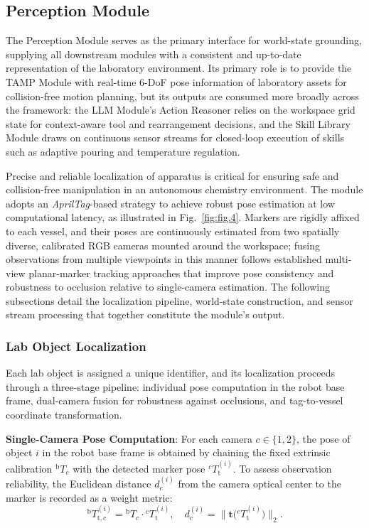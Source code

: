 \documentclass{ieeeaccess}
\begin{document}
\subsection{Perception Module}\label{sec:3.3}

The Perception Module serves as the primary interface for world-state grounding, supplying all downstream modules with a consistent and up-to-date representation of the laboratory environment. Its primary role is to provide the TAMP Module with real-time 6-DoF pose information of laboratory assets for collision-free motion planning, but its outputs are consumed more broadly across the framework: the LLM Module's Action Reasoner relies on the workspace grid state for context-aware tool and rearrangement decisions, and the Skill Library Module draws on continuous sensor streams for closed-loop execution of skills such as adaptive pouring and temperature regulation.

Precise and reliable localization of apparatus is critical for ensuring safe and collision-free manipulation in an autonomous chemistry environment. The module adopts an \textit{AprilTag}-based strategy \cite{wang2016apriltag} to achieve robust pose estimation at low computational latency, as illustrated in Fig.~\ref{fig:fig.4}. Markers are rigidly affixed to each vessel, and their poses are continuously estimated from two spatially diverse, calibrated RGB cameras mounted around the workspace; fusing observations from multiple viewpoints in this manner follows established multi-view planar-marker tracking approaches \cite{sarmadi2019simultaneous} that improve pose consistency and robustness to occlusion relative to single-camera estimation. The following subsections detail the localization pipeline, world-state construction, and sensor stream processing that together constitute the module's output.


\subsubsection{Lab Object Localization}\label{sec:3.3.1}
Each lab object is assigned a unique identifier, and its localization proceeds through a three-stage pipeline: individual pose computation in the robot base frame, dual-camera fusion for robustness against occlusions, and tag-to-vessel coordinate transformation.

\textbf{Single-Camera Pose Computation}: For each camera $c \in \{1, 2\}$, the pose of object $i$ in the robot base frame is obtained by chaining the fixed extrinsic calibration ${}^{\text{b}}T_{c}$ with the detected marker pose ${}^{c}T_{\text{t}}^{(i)}$. To assess observation reliability, the Euclidean distance $d_c^{(i)}$ from the camera optical center to the marker is recorded as a weight metric:
\begin{equation}
    {}^{\text{b}}T_{\text{t},c}^{(i)} = {}^{\text{b}}T_{c} \cdot {}^{c}T_{\text{t}}^{(i)}, \quad
    d_c^{(i)} = \bigl\|\mathbf{t}\bigl({}^{c}T_{\text{t}}^{(i)}\bigr)\bigr\|_2.
\end{equation}
\end{document}
